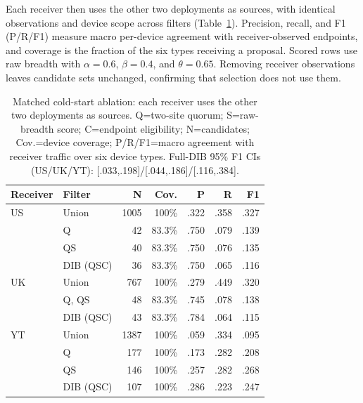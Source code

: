 \documentclass[journal]{IEEEtran}
\theoremstyle{definition}
\begin{document}
Each receiver then uses the other two deployments as sources, with identical observations and device scope across filters (Table~\ref{tab:threelab}). Precision, recall, and F1 (P/R/F1) measure macro per-device agreement with receiver-observed endpoints, and coverage is the fraction of the six types receiving a proposal. Scored rows use raw breadth with $\alpha=0.6$, $\beta=0.4$, and $\theta=0.65$. Removing receiver observations leaves candidate sets unchanged, confirming that selection does not use them.

\begin{table}[t]
\centering
\caption{Matched cold-start ablation: each receiver uses the other two deployments as sources. Q=two-site quorum; S=raw-breadth score; C=endpoint eligibility; N=candidates; Cov.=device coverage; P/R/F1=macro agreement with receiver traffic over six device types. Full-DIB 95\% F1 CIs (US/UK/YT): [.033,.198]/[.044,.186]/[.116,.384].}
\label{tab:threelab}
\scriptsize
\begin{tabular}{@{}llrrrrr@{}}
\toprule
Receiver & Filter & N & Cov. & P & R & F1 \\
\midrule
US & Union & 1005 & 100\% & .322 & .358 & .327 \\
 & Q & 42 & 83.3\% & .750 & .079 & .139 \\
 & QS & 40 & 83.3\% & .750 & .076 & .135 \\
 & DIB (QSC) & 36 & 83.3\% & .750 & .065 & .116 \\
\midrule
UK & Union & 767 & 100\% & .279 & .449 & .320 \\
 & Q, QS & 48 & 83.3\% & .745 & .078 & .138 \\
 & DIB (QSC) & 43 & 83.3\% & .784 & .064 & .115 \\
\midrule
YT & Union & 1387 & 100\% & .059 & .334 & .095 \\
 & Q & 177 & 100\% & .173 & .282 & .208 \\
 & QS & 146 & 100\% & .257 & .282 & .268 \\
 & DIB (QSC) & 107 & 100\% & .286 & .223 & .247 \\
\bottomrule
\end{tabular}
\end{table}
\end{document}
